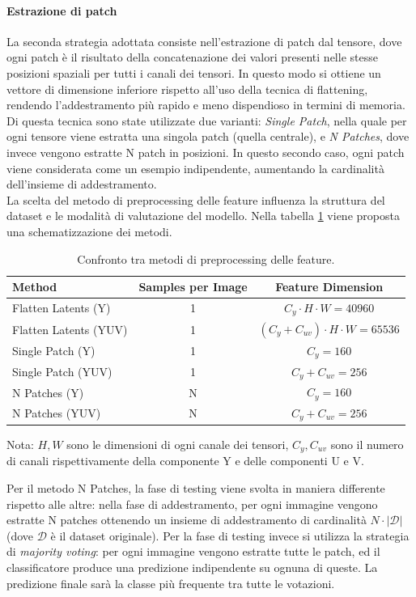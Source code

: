 \paragraph{Estrazione di patch} La seconda strategia adottata consiste nell'estrazione di patch dal tensore, dove ogni patch è il risultato della concatenazione dei valori presenti nelle stesse posizioni spaziali per tutti i canali dei tensori. In questo modo si ottiene un vettore di dimensione inferiore rispetto all'uso della tecnica di flattening, rendendo l'addestramento più rapido e meno dispendioso in termini di memoria.\\
Di questa tecnica sono state utilizzate due varianti: \textit{Single Patch}, nella quale per ogni tensore viene estratta una singola patch (quella centrale), e \textit{N Patches}, dove invece vengono estratte N patch in posizioni. In questo secondo caso, ogni patch viene considerata come un esempio indipendente, aumentando la cardinalità dell'insieme di addestramento.
\\

La scelta del metodo di preprocessing delle feature influenza la struttura del dataset e le modalità di valutazione del modello. Nella tabella \ref{tab:preprocessing_methods} viene proposta una schematizzazione dei metodi.
\begin{table}[H]
\centering
\caption{Confronto tra metodi di preprocessing delle feature.}\label{tab:preprocessing_methods}
\begin{tabularx}{\textwidth}{l c c}
\toprule
\textbf{Method} & \textbf{Samples per Image} & \textbf{Feature Dimension} \\
\midrule
Flatten Latents (Y)        & 1 & $C_y \cdot H \cdot W = 40960$ \\
Flatten Latents (YUV)     & 1 & $(C_y +C_{uv})\cdot H \cdot W = 65536$ \\
Single Patch (Y)        & 1 & $C_y = 160$ \\
Single Patch (YUV)     & 1 & $C_y + C_{uv} = 256$ \\
N Patches (Y)    & N & $C_y = 160$ \\
N Patches (YUV)        & N & $C_y + C_{uv} = 256$ \\
\bottomrule
\end{tabularx}
\small{Nota: $H,W$ sono le dimensioni di ogni canale dei tensori, $C_y, C_{uv}$ sono il numero di canali rispettivamente della componente Y e delle componenti U e V.}
\end{table}
Per il metodo N Patches, la fase di testing viene svolta in maniera differente rispetto alle altre: nella fase di addestramento, per ogni immagine vengono estratte N patches ottenendo un insieme di addestramento di cardinalità $N\cdot |\mathcal{D}|$ (dove $\mathcal{D}$ è il dataset originale). Per la fase di testing invece si utilizza la strategia di \textit{majority voting}: per ogni immagine vengono estratte tutte le patch, ed il classificatore produce una predizione indipendente su ognuna di queste. La predizione finale sarà la classe più frequente tra tutte le votazioni.
